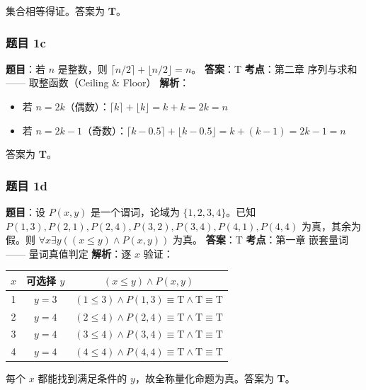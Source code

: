 \documentclass[10pt,a4paper,openany]{ctexbook}
\theoremstyle{definition}
\theoremstyle{remark}
\begin{document}
集合相等得证。答案为 \textbf{T}。
\vspace{-2pt}

\subsubsection{题目 1c}

\textbf{题目}：若 $n$ 是整数，则 $\lceil n/2 \rceil + \lfloor n/2 \rfloor = n$。
\textbf{答案}：T
\textbf{考点}：第二章 序列与求和 —— 取整函数（Ceiling \& Floor）
\textbf{解析}：
\begin{itemize}
\item 若 $n = 2k$（偶数）：$\lceil k \rceil + \lfloor k \rfloor = k + k = 2k = n$
\item 若 $n = 2k - 1$（奇数）：$\lceil k - 0.5 \rceil + \lfloor k - 0.5 \rfloor = k + (k - 1) = 2k - 1 = n$

\end{itemize}

答案为 \textbf{T}。
\vspace{-2pt}

\subsubsection{题目 1d}

\textbf{题目}：设 $P(x, y)$ 是一个谓词，论域为 $\{1, 2, 3, 4\}$。已知 $P(1,3), P(2,1), P(2,4), P(3,2), P(3,4), P(4,1), P(4,4)$ 为真，其余为假。则 $\forall x \exists y ((x \le y) \land P(x, y))$ 为真。
\textbf{答案}：T
\textbf{考点}：第一章 嵌套量词 —— 量词真值判定
\textbf{解析}：逐 $x$ 验证：
\begin{center}
\begin{tabular}{ccc}
\hline
$x$ & 可选择 $y$ & $(x \le y) \land P(x, y)$ \\ \hline
1 & $y = 3$ & $(1 \le 3) \land P(1,3) \equiv \mathrm{T} \land \mathrm{T} \equiv \mathrm{T}$ \\
2 & $y = 4$ & $(2 \le 4) \land P(2,4) \equiv \mathrm{T} \land \mathrm{T} \equiv \mathrm{T}$ \\
3 & $y = 4$ & $(3 \le 4) \land P(3,4) \equiv \mathrm{T} \land \mathrm{T} \equiv \mathrm{T}$ \\
4 & $y = 4$ & $(4 \le 4) \land P(4,4) \equiv \mathrm{T} \land \mathrm{T} \equiv \mathrm{T}$ \\
\hline
\end{tabular}

\end{center}

每个 $x$ 都能找到满足条件的 $y$，故全称量化命题为真。答案为 \textbf{T}。
\vspace{-2pt}
\end{document}
